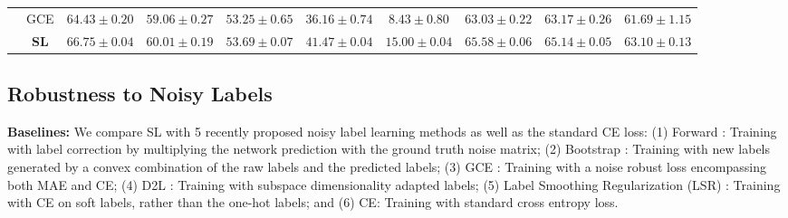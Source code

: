\documentclass[10pt,twocolumn,letterpaper]{article}
\begin{document}
\begin{table*}[!t]
\begin{adjustbox}{width=1\textwidth}
\begin{tabular}{c|c|ccccc|ccc}
 & GCE & $64.43 \pm 0.20$ & $59.06 \pm 0.27$ & $53.25 \pm 0.65$ & $36.16 \pm 0.74$ & $
 8.43 \pm 0.80$ & $63.03 \pm 0.22$ & $63.17 \pm 0.26$ & $61.69 \pm 1.15$ \\
 & \textbf{SL} & $\boldsymbol{66.75 \pm 0.04}$ & $\boldsymbol{60.01 \pm 0.19}$ & $\boldsymbol{53.69 \pm 0.07}$ & $\boldsymbol{41.47 \pm 0.04}$ & $\boldsymbol{15.00 \pm 0.04}$ & $\boldsymbol{65.58 \pm 0.06}$ & $\boldsymbol{65.14 \pm 0.05}$ & $\boldsymbol{63.10 \pm 0.13}$
\\ \hline
\end{tabular}
\end{adjustbox}
\label{result_table}
\vspace{-0.15 in}
\end{table*}

\subsection{Robustness to Noisy Labels}\label{benckmark_robust}

\noindent\textbf{Baselines:} We compare SL with 5 recently proposed noisy label learning methods as well as the standard CE loss: (1) Forward \cite{patrini2017making}: Training with label correction by multiplying the network prediction with the ground truth noise matrix; (2) Bootstrap \cite{reed2014training}: Training with new labels generated by a convex combination of the raw labels and the predicted labels; (3) GCE \cite{zhang2018generalized}: Training with a noise robust loss encompassing both MAE and CE; (4) D2L \cite{ma2018dimensionality}: Training with subspace dimensionality adapted labels; (5) Label Smoothing Regularization (LSR) \cite{pereyra2017regularizing}: Training with CE on soft labels, rather than the one-hot labels; and (6) CE: Training with standard cross entropy loss.
\end{document}
